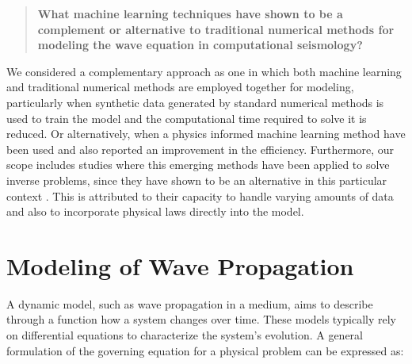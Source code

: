 \documentclass[11pt,twoside]{article}
\begin{document}
\vspace*{2mm}

\begin{tcolorbox}[colback=gray!20, colframe=gray!20, sharp corners]
\begin{quote}
\noindent\textbf{What machine learning techniques have shown to be a complement or alternative to traditional 
numerical methods for modeling the wave equation in computational seismology?}
\end{quote}
\end{tcolorbox}

\vspace*{2mm}

We considered a complementary approach as one in which both machine learning and traditional numerical methods are 
employed together for modeling, particularly when synthetic data generated by standard numerical methods is used to 
train the model and the computational time required to solve it is reduced. Or alternatively,
when a physics informed machine learning method have been used and also reported an improvement in the efficiency. 
Furthermore, our scope includes studies where this emerging methods have been applied to solve inverse problems, since 
they have shown to be an alternative in this particular context \citep{haghighat_physics-informed_2021,
raissi_hidden_2020, hao_physics-informed_2023}. This is attributed to their capacity to handle varying amounts 
of data and also to incorporate physical laws directly into the model.

\section{Modeling of Wave Propagation}\label{sec:modeling_wave_propagation}

A dynamic model, such as wave propagation in a medium, aims to describe through a function how a system changes over time. 
These models typically rely on differential equations to characterize the system's evolution. A general formulation of 
the governing equation for a physical problem can be expressed as:
\end{document}
